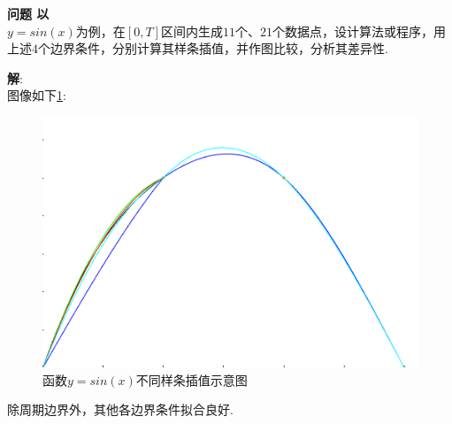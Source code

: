 \documentclass[UTF8]{ctexart}
\newenvironment{problem}[2][问题]
{\begin{mdframed}[backgroundcolor=gray!20] \textbf{#1 #2} \\}
	{\end{mdframed}}
\begin{document}
\begin{problem}{2}
	以$y=sin(x)$为例，在$[0,T]$区间内生成$11$个、$21$个数据点，设计算法或程序，用上述$4$个边界条件，分别计算其样条插值，并作图比较，分析其差异性.
\end{problem}
\textbf{解}:\\
图像如下\ref{fig:graph}:
\begin{figure}[H]
	\begin{center}
		\includegraphics[width=0.7\columnwidth]{figures/graph.png}
		\caption{函数$y=sin(x)$不同样条插值示意图}
		\label{fig:graph}
	\end{center}
\end{figure}
除周期边界外，其他各边界条件拟合良好.\\
\end{document}
